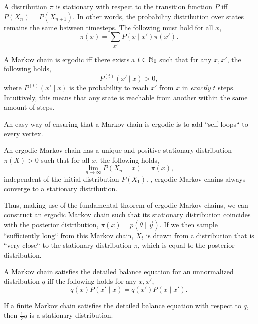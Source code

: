 \begin{definition}
  A distribution $\pi$ is stationary with respect to the transition function
  $P$ iff $P(X_n) = P(X_{n+1})$. In other words, the probability distribution
  over states remains the same between timesteps. The following must hold for
  all $x$, \[
    \pi(x) = \sum_{x'} P(x\mid x')\pi(x')
  .\]
\end{definition}

\begin{definition}[Ergodicity]
  A Markov chain is ergodic iff there exists a $t\in\mathbb{N}_0$ such that for any
  $x,x'$, the following holds, \[
    P^{(t)} (x'\mid x) > 0
  ,\]
  where $P^{(t)}(x'\mid x)$ is the probability to reach $x'$ from $x$ in
  \textit{exactly} $t$ steps. Intuitively, this means that any state is
  reachable from another within the same amount of steps.
\end{definition}

\begin{remark}
  An easy way of ensuring that a Markov chain is ergodic is to add
  ``self-loops`` to every vertex.
\end{remark}

\begin{theorem}
  An ergodic Markov chain has a unique and positive stationary distribution
  $\pi(X)>0$ such that for all $x$, the following holds, \[
    \lim_{n\to\infty} P(X_n = x) = \pi(x)
  ,\]
  independent of the initial distribution $P(X_1)$. \Ie, ergodic Markov chains
  always converge to a stationary distribution.
\end{theorem}

Thus, making use of the fundamental theorem of ergodic Markov chains, we can
construct an ergodic Markov chain such that its stationary distribution
coincides with the posterior distribution, $\pi(x) = p(\theta\mid\vec{y})$. If
we then sample ``sufficiently long`` from this Markov chain, $X_t$ is drawn
from a distribution that is ``very close`` to the stationary distribution
$\pi$, which is equal to the posterior distribution.

\begin{definition}
  A Markov chain satisfies the detailed balance equation for an unnormalized
  distribution $q$ iff the following holds for any $x,x'$, \[
    q(x)P(x'\mid x) = q(x')P(x\mid x')
  .\]
\end{definition}

\begin{theorem}{}{}
  If a finite Markov chain satisfies the detailed balance equation with
  respect to $q$, then $\frac{1}{Z}q$ is a stationary distribution.
\end{theorem}

